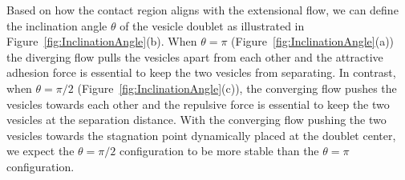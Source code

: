 \documentclass[prf,superscriptaddress,showkeys,longbibliography]{revtex4-1}
\begin{document}
Based on how the contact region aligns with the extensional flow, we can
define the inclination angle $\theta$ of the vesicle doublet as
illustrated in Figure~\ref{fig:InclinationAngle}(b). When $\theta=\pi$
(Figure~\ref{fig:InclinationAngle}(a)) the diverging flow pulls the
vesicles apart from each other and the attractive adhesion force is
essential to keep the two vesicles from separating.  In contrast, when
$\theta = \pi/2$ (Figure~\ref{fig:InclinationAngle}(c)), the converging
flow pushes the vesicles towards each other and the repulsive force is
essential to keep the two vesicles at the separation distance.  With the
converging flow pushing the two vesicles towards the stagnation point
dynamically placed at the doublet center, we expect the $\theta=\pi/2$
configuration to be more stable than the $\theta=\pi$ configuration. 
%
\end{document}
